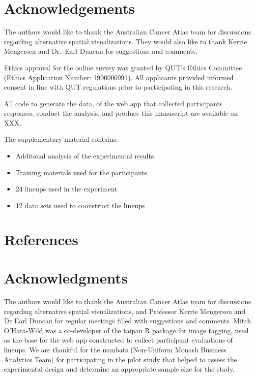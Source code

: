 \documentclass[conference,final,]{IEEEtran}
\providecommand{\tightlist}{%
  \setlength{\itemsep}{0pt}\setlength{\parskip}{0pt}}
\begin{document}
\hypertarget{acknowledgements}{%
\section{Acknowledgements}\label{acknowledgements}}

The authors would like to thank the Australian Cancer Atlas team for discussions regarding alternative spatial visualizations. They would also like to thank Kerrie Mengersen and Dr.~Earl Duncan for suggestions and comments.

Ethics approval for the online survey was granted by QUT's Ethics Committee (Ethics Application Number: 1900000991). All applicants provided informed consent in line with QUT regulations prior to participating in this research.

All code to generate the data, of the web app that collected participants responses, conduct the analysis, and produce this manuscript are available on XXX.

The supplementary material contains:

\begin{itemize}
\tightlist
\item
  Additonal analysis of the experimental results
\item
  Training materials used for the participants
\item
  24 lineups used in the experiment
\item
  12 data sets used to coonstruct the lineups
\end{itemize}

\hypertarget{references}{%
\section{References}\label{references}}

\newpage

\hypertarget{acknowledgments}{%
\section{Acknowledgments}\label{acknowledgments}}

The authors would like to thank the Australian Cancer Atlas team for discussions regarding alternative spatial visualizations, and Professor Kerrie Mengersen and Dr Earl Duncan for regular meetings filled with suggestions and comments. Mitch O'Hara-Wild was a co-developer of the taipan R package for image tagging, used as the base for the web app constructed to collect participant evaluations of lineups. We are thankful for the numbats (Non-Uniform Monash Business Analytics Team) for participating in the pilot study that helped to assess the experimental design and determine an appropriate sample size for the study.
\end{document}

